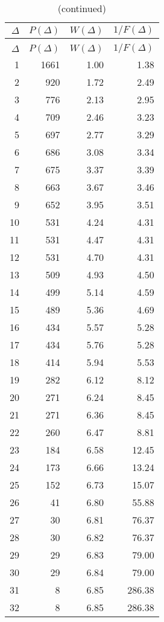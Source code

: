 \documentclass[12pt,letterpaper]{article}
\begin{document}
\begin{center}
\begin{longtable}{r|r|r|r}
\caption{$P(\Delta)$, $W(\Delta)$ and $1/F(\Delta)$ for $\Delta$ ranging from 1 to 64}\\
$\Delta$ & $P(\Delta)$ & $W(\Delta)$ & $1/F(\Delta)$\\ \hline \endfirsthead
\caption{(continued)}\\
$\Delta$ & $P(\Delta)$ & $W(\Delta)$ & $1/F(\Delta)$\\ \hline \endhead
1 & 1661 & 1.00 & 1.38\\
2 & 920 & 1.72 & 2.49\\
3 & 776 & 2.13 & 2.95\\
4 & 709 & 2.46 & 3.23\\
5 & 697 & 2.77 & 3.29\\
6 & 686 & 3.08 & 3.34\\
7 & 675 & 3.37 & 3.39\\
8 & 663 & 3.67 & 3.46\\
9 & 652 & 3.95 & 3.51\\
10 & 531 & 4.24 & 4.31\\
11 & 531 & 4.47 & 4.31\\
12 & 531 & 4.70 & 4.31\\
13 & 509 & 4.93 & 4.50\\
14 & 499 & 5.14 & 4.59\\
15 & 489 & 5.36 & 4.69\\
16 & 434 & 5.57 & 5.28\\
17 & 434 & 5.76 & 5.28\\
18 & 414 & 5.94 & 5.53\\
19 & 282 & 6.12 & 8.12\\
20 & 271 & 6.24 & 8.45\\
21 & 271 & 6.36 & 8.45\\
22 & 260 & 6.47 & 8.81\\
23 & 184 & 6.58 & 12.45\\
24 & 173 & 6.66 & 13.24\\
25 & 152 & 6.73 & 15.07\\
26 & 41 & 6.80 & 55.88\\
27 & 30 & 6.81 & 76.37\\
28 & 30 & 6.82 & 76.37\\
29 & 29 & 6.83 & 79.00\\
30 & 29 & 6.84 & 79.00\\
31 & 8 & 6.85 & 286.38\\
32 & 8 & 6.85 & 286.38\\

\end{longtable}
\end{center}
\end{document}
